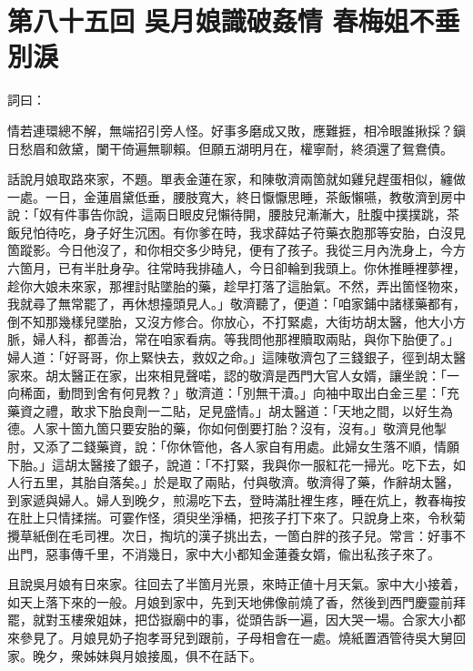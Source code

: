 
\chapter*{第八十五回 吳月娘識破姦情 春梅姐不垂別淚}


詞曰：

\begin{myquote}
情若連環總不解，無端招引旁人怪。好事多磨成又敗，應難捱，相冷眼誰揪採？鎭日愁眉和斂黛，闌干倚遍無聊賴。但願五湖明月在，權寧耐，終須還了鴛鴦債。

\end{myquote}

話說月娘取路來家，不題。單表金蓮在家，和陳敬濟兩箇就如雞兒趕蛋相似，纏做一處。一日，金蓮眉黛低垂，腰肢寬大，終日懨懨思睡，茶飯懶嚥，教敬濟到房中說：「奴有件事告你說，這兩日眼皮兒懶待開，腰肢兒漸漸大，肚腹中撲撲跳，茶飯兒怕待吃，身子好生沉困。有你爹在時，我求薛姑子符藥衣胞那等安胎，白沒見箇蹤影。今日他沒了，和你相交多少時兒，便有了孩子。{}我從三月內洗身上，今方六箇月，已有半肚身孕。往常時我排磕人，今日卻輪到我頭上。你休推睡裡夢裡，趁你大娘未來家，那裡討貼墜胎的藥，趁早打落了這胎氣。不然，弄出箇怪物來，我就尋了無常罷了，再休想擡頭見人。」敬濟聽了，便道：「咱家鋪中諸樣藥都有，倒不知那幾樣兒墜胎，又沒方修合。你放心，不打緊處，大街坊胡太醫，他大小方脈，婦人科，都善治，常在咱家看病。等我問他那裡贖取兩貼，與你下胎便了。」婦人道：「好哥哥，你上緊快去，救奴之命。」這陳敬濟包了三錢銀子，徑到胡太醫家來。胡太醫正在家，出來相見聲喏，認的敬濟是西門大官人女婿，讓坐說：「一向稀面，動問到舍有何見教？」敬濟道：「別無干瀆。」向袖中取出白金三星：「充藥資之禮，敢求下胎良劑一二貼，足見盛情。」胡太醫道：「天地之間，以好生為德。人家十箇九箇只要安胎的藥，你如何倒要打胎？沒有，沒有。」敬濟見他掣肘，又添了二錢藥資，說：「你休管他，各人家自有用處。此婦女生落不順，情願下胎。」這胡太醫接了銀子，說道：「不打緊，我與你一服紅花一掃光。吃下去，如人行五里，其胎自落矣。」於是取了兩貼，付與敬濟。敬濟得了藥，作辭胡太醫，到家遞與婦人。婦人到晚夕，煎湯吃下去，登時滿肚裡生疼，睡在炕上，教春梅按在肚上只情揉揣。可霎作怪，須臾坐淨桶，把孩子打下來了。只說身上來，令秋菊攪草紙倒在毛司裡。次日，掏坑的漢子挑出去，一箇白胖的孩子兒。常言：好事不出門，惡事傳千里，不消幾日，家中大小都知金蓮養女婿，偸出私孩子來了。

且說吳月娘有日來家。往回去了半箇月光景，來時正値十月天氣。家中大小接着，如天上落下來的一般。{}月娘到家中，先到天地佛像前燒了香，然後到西門慶靈前拜罷，就對玉樓衆姐妹，把岱嶽廟中的事，從頭告訴一遍，因大哭一場。{}合家大小都來參見了。月娘見奶子抱孝哥兒到跟前，子母相會在一處。燒紙置酒管待吳大舅回家。晚夕，衆姊妹與月娘接風，俱不在話下。

